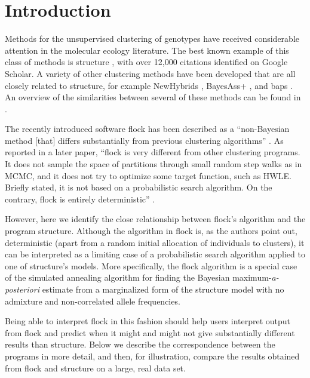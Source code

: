 
\section*{Introduction}
Methods for the unsupervised clustering of genotypes have received 
considerable attention in the molecular ecology literature.  
The best known example of this class of methods is {\sc structure} 
\citep{Pritchardetal2000}, with over 12,000 citations identified on 
Google Scholar.  A variety of other 
clustering methods have been developed that are all closely related to 
{\sc structure}, for example {\sc NewHybrids} \citep{And&Tho2002}, {\sc 
BayesAss+} \citep{Wil&Ran2003}, and {\sc baps} 
\citep{Coranderetal2004}. An overview of the similarities between several of these methods can be 
found in \citet{Anderson2009PGAC}.

The recently introduced software {\sc flock} \citep{Duc&Tur2009} has
been described
as a ``non-Bayesian method [that] 
differs substantially from previous 
clustering algorithms'' \citep[][p.~1333]{Duc&Tur2009}. As reported
in a later paper, ``{\sc flock} is very different from  other clustering 
programs. It does not sample the space of partitions through small 
random step walks as in MCMC, and it does not try to optimize some 
target function, such as HWLE\@. Briefly stated, it is not based on a 
probabilistic search algorithm. On the contrary, {\sc flock} is 
entirely deterministic'' \citep[][p.~736]{Duc&Tur2012}.

However, here we identify 
the close relationship between {\sc flock}'s algorithm and the program
{\sc structure}.  Although the algorithm in {\sc flock}
is, as the authors point out, deterministic (apart from a random initial allocation of 
individuals to clusters), it can be interpreted as a 
limiting case of a probabilistic search algorithm applied to one of {\sc structure}'s
models.  More specifically, the {\sc flock} 
algorithm is a special case of the simulated annealing
algorithm for finding the Bayesian maximum-{\em a-posteriori}
estimate from a marginalized form of the {\sc structure} model with no
admixture and non-correlated allele frequencies.  

Being able to interpret {\sc flock} in this fashion should help users
interpret output from {\sc flock} and predict when it might and might not
give substantially different results than {\sc structure}. Below we describe
the correspondence between the programs in more detail, and then, for illustration, compare
the results obtained from {\sc flock} and {\sc structure} on a large, real data
set.

